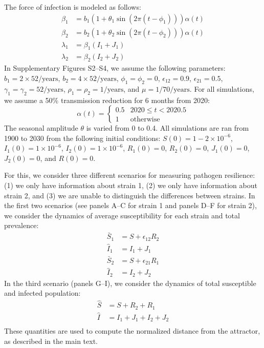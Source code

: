 \documentclass[12pt]{article}
\begin{document}
The force of infection is modeled as follows:
\begin{align}
\beta_1 &= b_1 (1 + \theta_1 \sin(2 \pi (t-\phi_1))) \alpha(t)\\
\beta_2 &= b_2 (1 + \theta_2 \sin(2 \pi (t-\phi_2))) \alpha(t)\\
\lambda_1 &= \beta_1 (I_1 + J_1)\\
\lambda_2 &= \beta_2 (I_2 + J_2)
\end{align}
In Supplementary Figures S2--S4, we assume the following parameters:
$b_1 = 2 \times 52/\mathrm{years}$, $b_2 = 4 \times 52/\mathrm{years}$, $\phi_1 = \phi_2 = 0$, $\epsilon_{12} = 0.9$, $\epsilon_{21} = 0.5$,
$\gamma_1 = \gamma_2 = 52/\mathrm{years}$, $\rho_1 = \rho_2 = 1/\mathrm{years}$, and $\mu=1/70/\mathrm{years}$.
For all simulations, we assume a 50\% transmission reduction for 6 months from 2020:
\begin{equation}
\alpha(t) = \begin{cases}
0.5 & 2020 \leq t< 2020.5\\
1 & \textrm{otherwise}
\end{cases}
\end{equation}
The seasonal amplitude $\theta$ is varied from 0 to 0.4.
All simulations are ran from 1900 to 2030 from the following initial conditions: 
$S(0) = 1 - 2\times 10^{-6}$, $I_1(0) = 1 \times 10^{-6}$, $I_2(0) = 1 \times 10^{-6}$, $R_1(0) = 0$, $R_2(0) = 0$, $J_1(0) = 0$, $J_2(0) = 0$, and $R(0) = 0$.

For this, we consider three different scenarios for measuring pathogen resilience: (1) we only have information about strain 1, (2) we only have information about strain 2, and (3) we are unable to distinguish the differences between strains.
In the first two scenarios (see panels A--C for strain 1 and panels D--F for strain 2), we consider the dynamics of average susceptibility for each strain and total prevalence:
\begin{align}
\bar{S}_1 &= S + \epsilon_{12} R_2\\
\hat{I}_1 &= I_1 + J_1\\
\bar{S}_2 &= S + \epsilon_{21} R_1\\
\hat{I}_2 &= I_2 + J_2
\end{align}
In the third scenario (panels G--I), we consider the dynamics of total susceptible and infected population:
\begin{align}
\hat{S} &= S + R_2 + R_1\\
\hat{I} &= I_1 + J_1 + I_2 + J_2\\
\end{align}
These quantities are used to compute the normalized distance from the attractor, as described in the main text.
\end{document}
